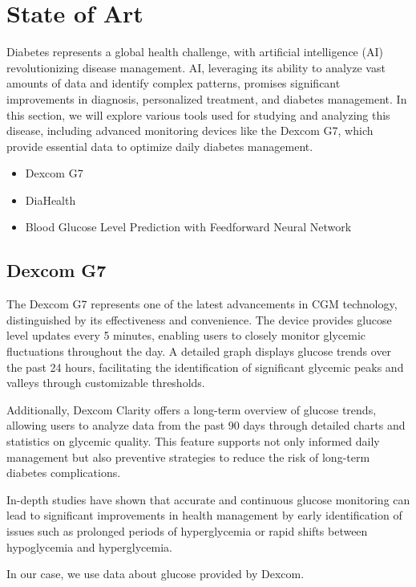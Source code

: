 \documentclass{article}
\begin{document}
\section{State of Art}

Diabetes represents a global health challenge, with artificial intelligence (AI) revolutionizing disease management. AI, leveraging its ability to analyze vast amounts of data and identify complex patterns, promises significant improvements in diagnosis, personalized treatment, and diabetes management. In this section, we will explore various tools used for studying and analyzing this disease, including advanced monitoring devices like the Dexcom G7, which provide essential data to optimize daily diabetes management.


\begin{itemize}
    \item Dexcom G7
    \item DiaHealth
    \item Blood Glucose Level Prediction with Feedforward Neural Network
\end{itemize}

\subsection{Dexcom G7}

The Dexcom G7 represents one of the latest advancements in CGM technology, distinguished by its effectiveness and convenience. The device provides glucose level updates every 5 minutes, enabling users to closely monitor glycemic fluctuations throughout the day. A detailed graph displays glucose trends over the past 24 hours, facilitating the identification of significant glycemic peaks and valleys through customizable thresholds.

Additionally, Dexcom Clarity offers a long-term overview of glucose trends, allowing users to analyze data from the past 90 days through detailed charts and statistics on glycemic quality. This feature supports not only informed daily management but also preventive strategies to reduce the risk of long-term diabetes complications.

In-depth studies have shown that accurate and continuous glucose monitoring can lead to significant improvements in health management by early identification of issues such as prolonged periods of hyperglycemia or rapid shifts between hypoglycemia and hyperglycemia.

In our case, we use data about glucose provided by Dexcom.
\end{document}
